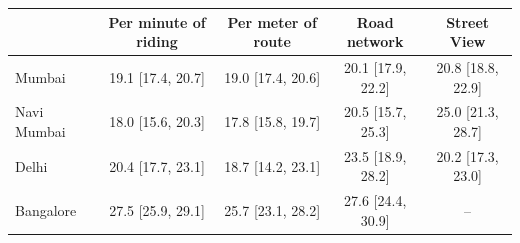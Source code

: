 \begin{tabular}{lcccc}
\toprule
 & Per minute of riding & Per meter of route & Road network & Street View \\
\midrule
Mumbai & 19.1 [17.4, 20.7] & 19.0 [17.4, 20.6] & 20.1 [17.9, 22.2] & 20.8 [18.8, 22.9] \\
Navi Mumbai & 18.0 [15.6, 20.3] & 17.8 [15.8, 19.7] & 20.5 [15.7, 25.3] & 25.0 [21.3, 28.7] \\
Delhi & 20.4 [17.7, 23.1] & 18.7 [14.2, 23.1] & 23.5 [18.9, 28.2] & 20.2 [17.3, 23.0] \\
Bangalore & 27.5 [25.9, 29.1] & 25.7 [23.1, 28.2] & 27.6 [24.4, 30.9] & -- \\
\bottomrule
\end{tabular}
